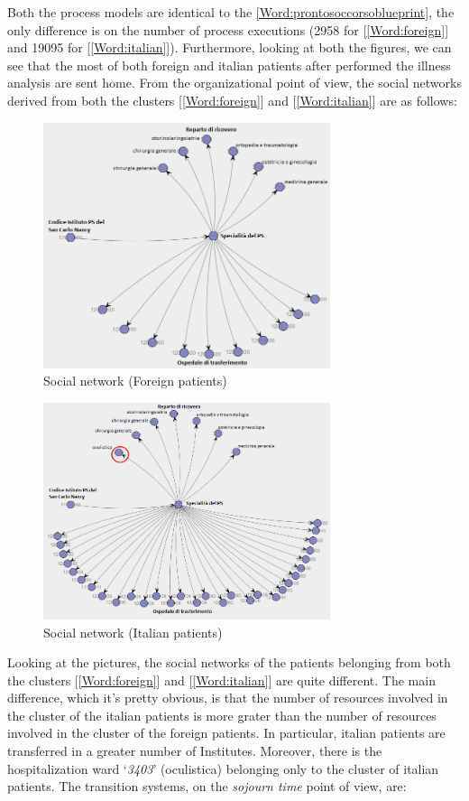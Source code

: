 Both the process models are identical to the \ref{Word:prontosoccorsoblueprint}, the only difference is on the number of process executions (2958 for [\ref{Word:foreign}] and 19095 for [\ref{Word:italian}]). Furthermore, looking at both the figures, we can see that the most of both foreign and italian patients after performed the illness analysis are sent home. From the organizational point of view, the social networks derived from both the clusters [\ref{Word:foreign}] and [\ref{Word:italian}] are as follows:
\begin{figure} [htbp]
\includegraphics[width=0.75\textwidth , keepaspectratio]{ProntoSoccorsoHoWForeigns}
\caption{Social network (Foreign patients)}
\end{figure}
\clearpage
\noindent
\begin{figure}
\includegraphics[width=0.75\textwidth , keepaspectratio]{ProntoSoccorsoHoWItalians}
\caption{Social network (Italian patients)}
\end{figure}
Looking at the pictures, the social networks of the patients belonging from both the clusters [\ref{Word:foreign}] and [\ref{Word:italian}] are quite different. The main difference, which it’s pretty obvious, is that the number of resources involved in the cluster of the italian patients is more grater than the number of resources involved in the cluster of the foreign patients. In particular, italian patients are transferred in a greater number of Institutes. Moreover, there is the hospitalization ward `\textit{3403}' (oculistica) belonging only to the cluster of italian patients. The transition systems, on the \textit{sojourn time} point of view, are:
